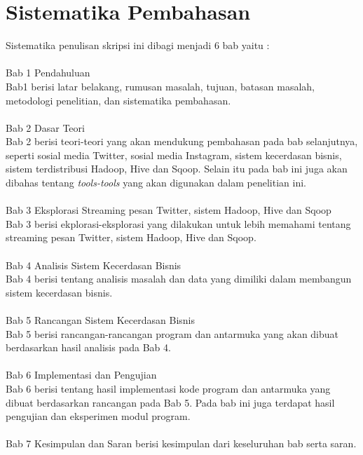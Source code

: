 \section{Sistematika Pembahasan}
\label{sec:sistematika_pembahasan}
Sistematika penulisan skripsi ini dibagi menjadi 6 bab yaitu :\\
 \\
Bab 1 Pendahuluan\\ 
Bab1 berisi latar belakang, rumusan masalah, tujuan, batasan masalah, metodologi penelitian, dan sistematika pembahasan.
\\\\
Bab 2 Dasar Teori\\
Bab 2 berisi teori-teori yang akan mendukung pembahasan pada bab selanjutnya, seperti sosial media Twitter, sosial media Instagram, sistem kecerdasan bisnis, sistem terdistribusi Hadoop, Hive dan Sqoop. Selain itu pada bab ini juga akan dibahas tentang \textit{tools-tools} yang akan digunakan dalam penelitian ini.
\\\\
Bab 3 Eksplorasi Streaming pesan Twitter, sistem Hadoop, Hive dan Sqoop\\
Bab 3 berisi ekplorasi-eksplorasi yang dilakukan untuk lebih memahami tentang streaming pesan Twitter, sistem Hadoop, Hive dan Sqoop.
\\\\
Bab 4 Analisis Sistem Kecerdasan Bisnis\\
Bab 4 berisi tentang analisis masalah dan data yang dimiliki dalam membangun sistem kecerdasan bisnis.
\\\\
Bab 5 Rancangan Sistem Kecerdasan Bisnis\\
Bab 5 berisi rancangan-rancangan program dan antarmuka yang akan dibuat berdasarkan hasil analisis pada Bab 4.
\\\\
Bab 6 Implementasi dan Pengujian\\
Bab 6 berisi tentang hasil implementasi kode program dan antarmuka yang dibuat berdasarkan rancangan pada Bab 5. Pada bab ini juga terdapat hasil pengujian dan eksperimen modul program.
\\\\
Bab 7 Kesimpulan dan Saran berisi kesimpulan dari keseluruhan bab serta saran.\\
